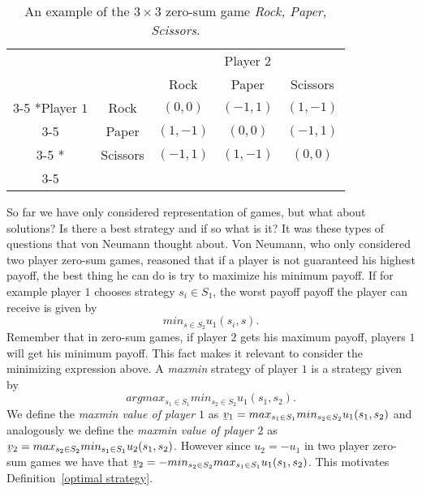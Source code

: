 \documentclass{article}
\theoremstyle{definition}
\theoremstyle{remark}
\newcommand{\ubar}[1]{\underaccent{\bar}{#1}}
\begin{document}
\begin{table}[h!]
  \begin{center}
    \setlength{\extrarowheight}{2pt}
    \begin{tabular}{cc|c|c|c|}
      & \multicolumn{2}{c}{} & \multicolumn{1}{c}{Player $2$} & \multicolumn{1}{c}{}\\
      & \multicolumn{1}{c}{} & \multicolumn{1}{c}{Rock}  &
                                                          \multicolumn{1}{c}{Paper} & \multicolumn{1}{c}{Scissors} \\\cline{3-5}
      \multirow{2}*{Player $1$}  & Rock & $(0,0)$ & $(-1,1)$ & $(1,-1)$\\\cline{3-5}
      & Paper & $(1,-1)$ & $(0,0)$ & $(-1,1)$\\\cline{3-5}
           \multirow{1}*{}  & Scissors & $(-1,1)$ & $(1,-1)$ & $(0,0)$\\\cline{3-5}   \end{tabular}
    \caption{An example of the $3\times 3$ zero-sum game \emph{Rock,
        Paper, Scissors}.}
    \label{Rock Paper Scissors}
    \end{center}
  \end{table}


So far we have
only considered representation of games, but what about solutions?
Is there a best strategy and if so what is it? It was these types of
questions that von Neumann thought about. Von Neumann, who only
considered two player zero-sum games, reasoned that if
a player is not guaranteed his highest payoff, the best thing he can
do is try to maximize his minimum payoff. If for example player $1$
chooses strategy $s_i \in S_1$, the worst payoff payoff the player can
receive is given by $$min_{s \in S_2} u_1(s_i,s).$$ Remember that in
zero-sum games, if player $2$ gets his maximum payoff, players $1$
will get his minimum payoff. This fact makes it relevant to consider
the minimizing expression above. A \emph{maxmin} strategy of player
$1$ is a strategy given by $$argmax_{s_1 \in S_1} min_{s_2 \in S_2}
u_1(s_1,s_2).$$ We define the \emph{maxmin value of player $1$} as
$\ubar{v}_1 = max_{s_1 \in S_1} min_{s_2 \in S_2}u_1(s_1,s_2)$ and
analogously we define the \emph{maxmin value of player $2$} as
$\ubar{v}_2 = max_{s_2 \in S_2} min_{s_1 \in
  S_1}u_2(s_1,s_2)$. However since $u_2 = -u_1$ in two player zero-sum
games we have that $\ubar{v}_2 = -min_{s_2 \in S_2} max_{s_1 \in S_1}
u_1(s_1,s_2)$. This motivates Definition~\ref{optimal strategy}.
\end{document}
